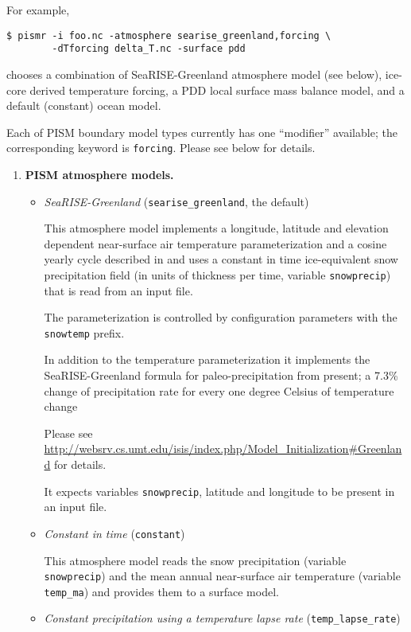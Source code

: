 For example,
\begin{verbatim}
$ pismr -i foo.nc -atmosphere searise_greenland,forcing \
        -dTforcing delta_T.nc -surface pdd
\end{verbatim}%
chooses a combination of SeaRISE-Greenland atmosphere model (see below),  ice-core derived temperature forcing, a PDD local surface mass balance model, and a default (constant) ocean model.

Each of PISM boundary model types currently has one ``modifier'' available; the corresponding keyword is \texttt{forcing}. Please see below for details.

\begin{enumerate}
\item \textbf{PISM atmosphere models.}
  \begin{itemize}
  \item \emph{SeaRISE-Greenland} (\verb|searise_greenland|, the default)

    This atmosphere model implements a longitude, latitude and elevation dependent near-surface air temperature parameterization and a cosine yearly cycle described in \cite{Faustoetal2009} and uses a constant in time ice-equivalent snow precipitation field (in units of thickness per time, variable \verb|snowprecip|) that is read from an input file.

    The parameterization is controlled by configuration parameters with the \texttt{snow\und temp} prefix.

    In addition to the temperature parameterization it implements the SeaRISE-Greenland formula for paleo-precipitation from present; a 7.3\% change of precipitation rate for every one degree Celsius of temperature change \cite{Huybrechts02}

    Please see \url{http://websrv.cs.umt.edu/isis/index.php/Model_Initialization#Greenland} for details.

    It expects variables \verb|snowprecip|, latitude and longitude to be present in an input file.

 \item \emph{Constant in time} (\verb|constant|)

    This atmosphere model reads the snow precipitation (variable \verb|snowprecip|) and the mean annual near-surface air temperature (variable \verb|temp_ma|) and provides them to a surface model.
  \item \emph{Constant precipitation using a temperature lapse rate} (\verb|temp_lapse_rate|)
    

\end{itemize}
\end{enumerate}
